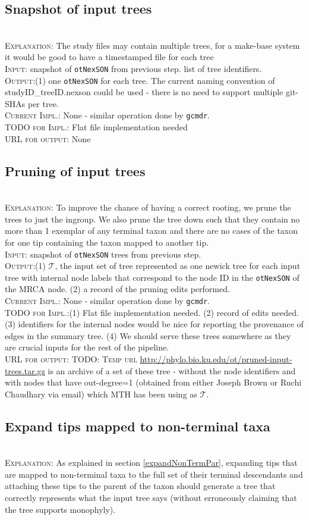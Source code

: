 \documentclass[11pt]{article}
\newcommand{\nexson}[0]{\texttt{otNexSON}\xspace}
\newcommand{\gcmdr}[0]{\texttt{gcmdr}\xspace}
\newcommand{\stepExplanation}[0]{\\\noindent\textsc{Explanation}:\xspace}
\newcommand{\stepInput}[0]{\\\noindent\textsc{Input}:\xspace}
\newcommand{\stepOutput}[0]{\\\noindent\textsc{Output}:\xspace}
\newcommand{\currImpl}[0]{\\\noindent\textsc{Current Impl.}:\xspace}
\newcommand{\implTODO}[0]{\\\noindent\textsc{TODO for Impl.}:\xspace}
\newcommand{\currURL}[0]{\\\noindent\textsc{URL for output}:\xspace}
\newcommand{\comment}[1]{{\color{red} \textsc{#1}}\xspace}
\newcommand{\TODO}[1]{\comment{TODO: #1}}
\newcommand{\phyloInputs}[0]{\ensuremath{\mathcal{T}}}
\begin{document}
\subsection{Snapshot of input trees}
\stepExplanation The study files may contain multiple trees, for a make-base system it would
    be good to have a timestamped file for each tree
\stepInput snapshot of \nexson from previous step. list of tree identifiers.
\stepOutput (1) one \nexson for each tree. The current naming convention of studyID\_treeID.nexson could
    be used - there is no need to support multiple git-SHAs per tree.
\currImpl None - similar operation done by \gcmdr.
\implTODO Flat file implementation needed
\currURL None
 
\subsection{Pruning of input trees}
\stepExplanation To improve the chance of having a correct rooting, we prune
    the trees to just the ingroup.
    We also prune the tree down such that they contain no more than 1 exemplar of any
    terminal taxon and there are no cases of the taxon for one tip containing
    the taxon mapped to another tip.
\stepInput snapshot of \nexson trees from previous step.
\stepOutput (1) \phyloInputs, the input set of tree represented as
    one newick tree for each input tree with internal node labels that 
    correspond to the node ID in the \nexson of the MRCA node.
    (2) a record of the pruning edits performed.
\currImpl None - similar operation done by \gcmdr.
\implTODO (1) Flat file implementation needed. 
    (2) record of edits needed. 
    (3) identifiers for the internal nodes would be nice for reporting the provenance of edges in the 
    summary tree. 
    (4) We should serve these trees somewhere as they are crucial inputs for the rest of the pipeline.
\currURL \TODO{Temp url} \url{http://phylo.bio.ku.edu/ot/pruned-input-trees.tar.gz} is an
    archive of a set of these tree - without the node identifiers and with nodes that have 
    out-degree=1 (obtained from either Joseph Brown or Ruchi Chaudhary via email) which MTH has been
    using as \phyloInputs.

    \subsection{Expand tips mapped to non-terminal taxa}\label{expandedPhyloStep}
\stepExplanation As explained in section \ref{expandNonTermPar}, expanding tips that are mapped
    to non-terminal taxa to the full set of their terminal descendants and attaching these
    tips to the parent of the taxon should generate a tree that correctly represents
    what the input tree says (without erroneously claiming that the tree supports monophyly).
    
\end{document}
